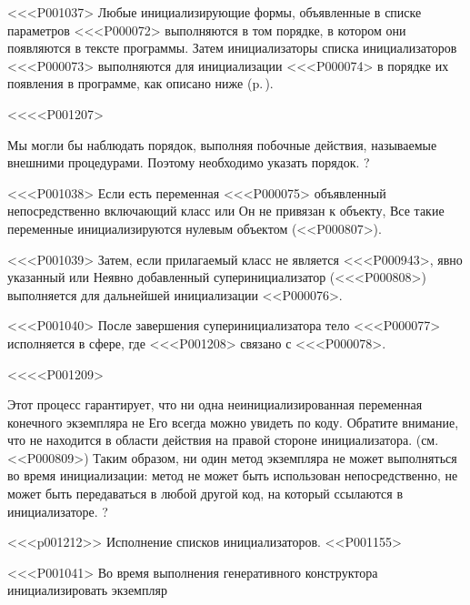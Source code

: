{{{{{<<<P001037>%
Любые инициализирующие формы, объявленные в списке параметров <<<P000072>
выполняются в том порядке, в котором они появляются в тексте программы.
Затем инициализаторы списка инициализаторов <<<P000073> выполняются для инициализации <<<P000074>
в порядке их появления в программе, как описано ниже
(p.\,\pageref{executionOfInitializerLists}).

<<<<P001207>{%
Мы могли бы наблюдать порядок, выполняя побочные действия, называемые внешними процедурами.
Поэтому необходимо указать порядок.%
?

<<<P001038>%
Если есть переменная <<<P000075> объявленный
непосредственно включающий класс или
Он не привязан к объекту,
Все такие переменные инициализируются нулевым объектом (<<P000807>).

<<<P001039>%
Затем, если прилагаемый класс не является <<<P000943>, явно указанный или
Неявно добавленный суперинициализатор (<<<P000808>) выполняется для
дальнейшей инициализации <<P000076>.

<<<P001040>%
После завершения суперинициализатора тело <<<P000077> исполняется
в сфере, где <<<P001208>{} связано с <<<P000078>.

<<<<P001209>{%
Этот процесс гарантирует, что ни одна неинициализированная переменная конечного экземпляра не
Его всегда можно увидеть по коду.
Обратите внимание, что \THIS{} не находится в области действия на правой стороне инициализатора.
(см. <<P000809>)
Таким образом, ни один метод экземпляра не может выполняться во время инициализации:
метод не может быть использован непосредственно,
не может быть \THIS{} передаваться в любой другой код, на который ссылаются
в инициализаторе.%
?


<<<p001212>> Исполнение списков инициализаторов.
<<P001155>

<<<P001041>%
Во время выполнения генеративного конструктора инициализировать экземпляр
}}}}}}}
